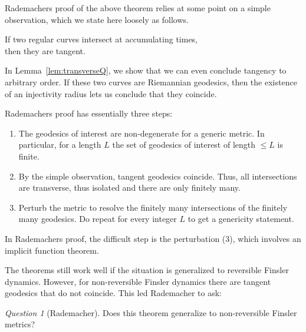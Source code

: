 \documentclass{amsart}
\theoremstyle{definition}
\theoremstyle{remark}
\newtheorem{question}[proposition]{Question}
\numberwithin{equation}{section}
\begin{document}
Rademachers proof of the above theorem relies at some point on a simple observation, which we state here loosely as follows. 
\begin{center}
    If two regular curves intersect at accumulating times, \\then they are tangent. 
\end{center}
In Lemma~\ref{lem:transverseQ}, we show that we can even conclude tangency to arbitrary order. If these two curves are Riemannian geodesics, then the existence of an injectivity radius lets us conclude that they coincide. 

Rademachers proof has essentially three steps:
\begin{enumerate}
    \item The geodesics of interest are non-degenerate for a generic metric. In particular, for a length $L$ the set of geodesics of interest of length $\leq L$ is finite. 
    \item By the simple observation, tangent geodesics coincide. Thus, all intersections are transverse, thus isolated and there are only finitely many.
    \item Perturb the metric to resolve the finitely many intersections of the finitely many geodesics. Do repeat for every integer $L$ to get a genericity statement. 
\end{enumerate}
In Rademachers proof, the difficult step is the perturbation (3), which involves an implicit function theorem. 

The theorems still work well if the situation is generalized to reversible Finsler dynamics. However, for non-reversible Finsler dynamics there are tangent geodesics that do not coincide. This led Rademacher to ask:
\begin{question}[Rademacher]
    Does this theorem generalize to non-reversible Finsler metrics?
\end{question}
\end{document}
